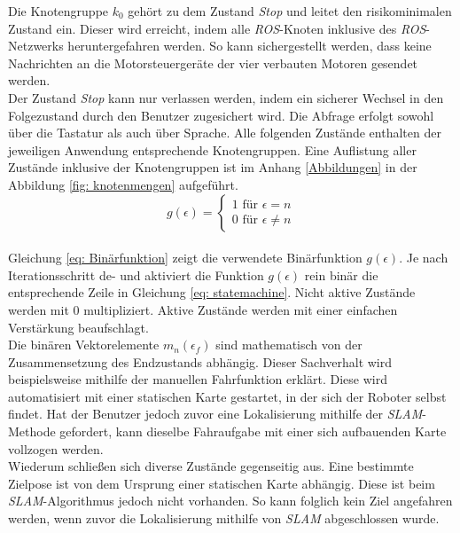 		Die Knotengruppe $k_0$ gehört zu dem Zustand \textit{Stop} und leitet den risikominimalen Zustand ein. Dieser wird erreicht, indem alle \textit{ROS}-Knoten inklusive des \textit{ROS}-Netzwerks heruntergefahren werden. So kann sichergestellt werden, dass keine Nachrichten an die Motorsteuergeräte der vier verbauten Motoren gesendet werden.\\
		
		Der Zustand \textit{Stop} kann nur verlassen werden, indem ein sicherer Wechsel in den Folgezustand durch den Benutzer zugesichert wird. Die Abfrage erfolgt sowohl über die Tastatur als auch über Sprache. Alle folgenden Zustände enthalten der jeweiligen Anwendung entsprechende Knotengruppen. Eine Auflistung aller Zustände inklusive der Knotengruppen ist im Anhang \ref{Abbildungen} in der Abbildung \ref{fig: knotenmengen} aufgeführt.\\ 
	
	\begin{equation}
	g(\epsilon)=\left\{\begin{array}{ll} 1 \text{ für } \epsilon=n \\
	0 \text{ für }\epsilon\neq n\end{array}\right. 
	\label{eq: Binärfunktion}
	\end{equation}\\
		
		Gleichung \ref{eq: Binärfunktion} zeigt die verwendete Binärfunktion $g(\epsilon)$. Je nach Iterationsschritt de- und aktiviert die Funktion $g(\epsilon)$ rein binär die entsprechende Zeile in Gleichung \ref{eq: statemachine}. Nicht aktive Zustände werden mit 0 multipliziert. Aktive Zustände werden mit einer einfachen Verstärkung beaufschlagt. \\
		
		Die binären Vektorelemente $m_n(\epsilon_f)$ sind mathematisch von der Zusammensetzung des Endzustands abhängig. Dieser Sachverhalt wird beispielsweise mithilfe der manuellen Fahrfunktion erklärt. Diese wird automatisiert mit einer statischen Karte gestartet, in der sich der Roboter selbst findet. Hat der Benutzer jedoch zuvor eine Lokalisierung mithilfe der \textit{SLAM}-Methode gefordert, kann dieselbe Fahraufgabe mit einer sich aufbauenden Karte vollzogen werden.\\
		
		Wiederum schließen sich diverse Zustände gegenseitig aus. Eine bestimmte Zielpose ist von dem Ursprung einer statischen Karte abhängig. Diese ist beim \textit{SLAM}-Algorithmus jedoch nicht vorhanden. So kann folglich kein Ziel angefahren werden, wenn zuvor die Lokalisierung mithilfe von \textit{SLAM} abgeschlossen wurde.\\
		
